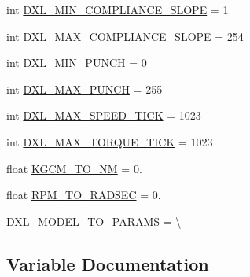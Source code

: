 \begin{DoxyCompactItemize}
\item 
int \hyperlink{namespacedynamixel__driver_1_1dynamixel__const_a9585dfbc67d9fa0d82510a7439cdfe52}{D\+X\+L\+\_\+\+M\+I\+N\+\_\+\+C\+O\+M\+P\+L\+I\+A\+N\+C\+E\+\_\+\+S\+L\+O\+PE} = 1
\item 
int \hyperlink{namespacedynamixel__driver_1_1dynamixel__const_ab1d19a23dfe83e0d53d7dc42b365cf5d}{D\+X\+L\+\_\+\+M\+A\+X\+\_\+\+C\+O\+M\+P\+L\+I\+A\+N\+C\+E\+\_\+\+S\+L\+O\+PE} = 254
\item 
int \hyperlink{namespacedynamixel__driver_1_1dynamixel__const_ab8dd367d7394905a11fb63c1ac876524}{D\+X\+L\+\_\+\+M\+I\+N\+\_\+\+P\+U\+N\+CH} = 0
\item 
int \hyperlink{namespacedynamixel__driver_1_1dynamixel__const_a9ee8e371256ff45d661612e4e7222deb}{D\+X\+L\+\_\+\+M\+A\+X\+\_\+\+P\+U\+N\+CH} = 255
\item 
int \hyperlink{namespacedynamixel__driver_1_1dynamixel__const_adabc18c7e20a82353147b3edadfa5092}{D\+X\+L\+\_\+\+M\+A\+X\+\_\+\+S\+P\+E\+E\+D\+\_\+\+T\+I\+CK} = 1023
\item 
int \hyperlink{namespacedynamixel__driver_1_1dynamixel__const_a67ee6dd3a37437f46f676032cfa22755}{D\+X\+L\+\_\+\+M\+A\+X\+\_\+\+T\+O\+R\+Q\+U\+E\+\_\+\+T\+I\+CK} = 1023
\item 
float \hyperlink{namespacedynamixel__driver_1_1dynamixel__const_ab1d6d58ed18ed3482cd041ccc3dc064a}{K\+G\+C\+M\+\_\+\+T\+O\+\_\+\+NM} = 0.
\item 
float \hyperlink{namespacedynamixel__driver_1_1dynamixel__const_a33b5502e1b782882dbdd3c41acbf5efe}{R\+P\+M\+\_\+\+T\+O\+\_\+\+R\+A\+D\+S\+EC} = 0.
\item 
\hyperlink{namespacedynamixel__driver_1_1dynamixel__const_a17bbecfe8b9fd2f34f2bf763f60edd9e}{D\+X\+L\+\_\+\+M\+O\+D\+E\+L\+\_\+\+T\+O\+\_\+\+P\+A\+R\+A\+MS} = \textbackslash{}
\end{DoxyCompactItemize}


\subsection{Variable Documentation}
\mbox{\label{namespacedynamixel__driver_1_1dynamixel__const_a47fdd52e119bdcded6911b8862d0012c}} 
